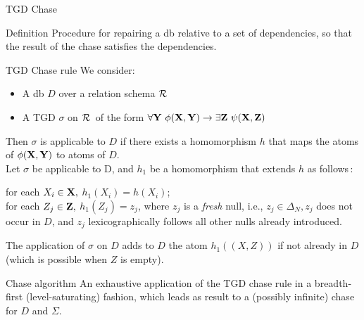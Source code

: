 \documentclass{beamer}
\def\R{\hbox{${\cal{R}}$}}
\begin{document}
 \begin{frame}{TGD Chase}
 \tiny
 \begin{block}{Definition}
 Procedure  for repairing a db relative to a set of dependencies, so that the result of the chase satisfies the dependencies.
 \end{block}
 
 \begin{block}{TGD Chase rule}
 We consider:
 \begin{itemize}
 \item A db $D$ over a relation schema \R
 \item A TGD $\sigma$ on \R\ of the form $ \forall \bf{Y} ~\phi(\bf{X}, \bf{Y})  \rightarrow \exists \bf{Z} ~\psi (\bf{X}, \bf{Z})$
 \end{itemize}
 Then $\sigma$ is applicable to $D$ if there exists a homomorphism $h$ that maps the atoms of $\phi(\bf{X}, \bf{Y})$
  to atoms of $D$.\\
  
  \vspace{0.3cm}
  Let $\sigma$ be applicable to D, and $h_1$ be a homomorphism that extends $h$ as follows\,: 
  
  for each $X_i \in \bf{X},$ $ h_1(X_i) = h(X_i)$; \\
  for each $Z_j \in  \bf{Z}, $  $h_1(Z_j) = z_j$,    where $z_j$ is a \textit{fresh} null, i.e., $z_j \in \Delta_ N , z_j$ does not occur in $D$, and $z_j $
  lexicographically follows all other nulls already introduced. 
  
  \vspace{0.3cm}
  The application of $\sigma$ on $D$ adds to $D$ the atom $h_1( (X,Z))$ if not already in $D$ (which is possible when $Z$ is empty).
 \end{block}
 
 \begin{block}{Chase algorithm}
  An exhaustive application of the TGD chase rule in a breadth-first (level-saturating) fashion, which leads as result to a (possibly infinite) chase for $D$ and $\Sigma$.
 \end{block}
 
 \end{frame}
 
\end{document}
